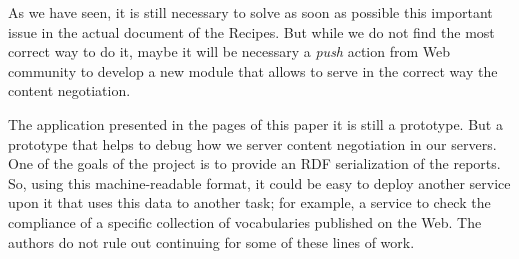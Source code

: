As we have seen, it is still necessary to solve as soon as possible this 
important issue in the actual document of the Recipes. But while we do not 
find the most correct way to do it, maybe it will be necessary a \textit{push} 
action from Web community to develop a new module that allows to serve in the 
correct way the content negotiation.

The application presented in the pages of this paper it is still a prototype.
But a prototype that helps to debug how we server content negotiation in our
servers. One of the goals of the project is to provide an RDF serialization 
of the reports. So, using this machine-readable format, it could be easy to
deploy another service upon it that uses this data to another task; for 
example, a service to check the compliance of a specific collection of 
vocabularies published on the Web. The authors do not rule out continuing 
for some of these lines of work.

